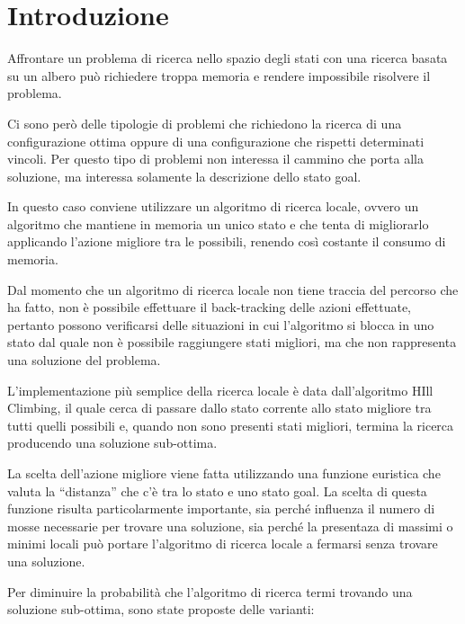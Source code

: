
\section{Introduzione}

Affrontare un problema di ricerca nello spazio degli stati con una ricerca basata su un albero può richiedere troppa memoria e rendere impossibile risolvere il problema.

Ci sono però delle tipologie di problemi che richiedono la ricerca di una configurazione ottima oppure di una configurazione che rispetti determinati vincoli.
Per questo tipo di problemi non interessa il cammino che porta alla soluzione, ma interessa solamente la descrizione dello stato goal.

In questo caso conviene utilizzare un algoritmo di ricerca locale, ovvero un algoritmo che mantiene in memoria un unico stato e che tenta di migliorarlo applicando l'azione migliore tra le possibili, renendo così costante il consumo di memoria.

Dal momento che un algoritmo di ricerca locale non tiene traccia del percorso che ha fatto, non è possibile effettuare il back-tracking delle azioni effettuate, pertanto possono verificarsi delle situazioni in cui l'algoritmo si blocca in uno stato dal quale non è possibile raggiungere stati migliori, ma che non rappresenta una soluzione del problema.

L'implementazione più semplice della ricerca locale è data dall'algoritmo HIll Climbing, il quale cerca di passare dallo stato corrente allo stato migliore tra tutti quelli possibili e, quando non sono presenti stati migliori, termina la ricerca producendo una soluzione sub-ottima.

La scelta dell'azione migliore viene fatta utilizzando una funzione euristica che valuta la ``distanza'' che c'è tra lo stato e uno stato goal. La scelta di questa funzione risulta particolarmente importante, sia perché influenza il numero di mosse necessarie per trovare una soluzione, sia perché la presentaza di massimi o minimi locali può portare l'algoritmo di ricerca locale a fermarsi senza trovare una soluzione.

Per diminuire la probabilità che l'algoritmo di ricerca termi trovando una soluzione sub-ottima, sono state proposte delle varianti:

